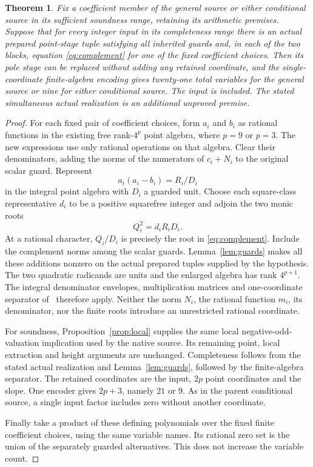 \documentclass[11pt,a4paper]{article}
\newtheorem{theorem}{Theorem}[section]
\begin{document}
\begin{theorem}\label{thm:reduction}
Fix a coefficient member of the general source or either conditional
source in its sufficient soundness range, retaining its arithmetic
premises. Suppose that for every integer input in its completeness
range there is an actual prepared point-stage tuple satisfying all
inherited guards and, in each of the two blocks, equation
\eqref{eq:complement} for one of the fixed coefficient choices.
Then its pole stage can be replaced without adding any retained
coordinate, and the single-coordinate finite-algebra encoding gives
twenty-one total variables for the general source or nine for either
conditional source. The input is included.
The stated simultaneous actual realization is an additional
unproved premise.
\end{theorem}
\begin{proof}
For each fixed pair of coefficient choices, form $a_i$ and $b_i$
as rational functions in the existing free rank-$4^p$ point algebra,
where $p=9$ or $p=3$. The new expressions use only rational
operations on that algebra. Clear their denominators, adding the
norms of the numerators of $c_i+N_i$ to the original scalar guard.
Represent
\[
                        a_i(a_i-b_i)=R_i/D_i
\]
in the integral point algebra with $D_i$ a guarded unit.
Choose each square-class representative $d_i$ to be a positive
squarefree integer and adjoin the two monic roots
\[
                            Q_i^2=d_iR_iD_i.
\]
At a rational character, $Q_i/D_i$ is precisely the root in
\eqref{eq:complement}. Include the complement norms among the
scalar guards. Lemma~\ref{lem:guards} makes all these additions
nonzero on the actual prepared tuples supplied by the hypothesis.
The two quadratic radicands are units and the enlarged algebra
has rank $4^{p+1}$. The integral denominator envelopes, multiplication
matrices and one-coordinate separator of~\cite{Unit} therefore apply.
Neither the norm $N_i$, the rational function $m_i$, its denominator,
nor the finite roots introduce an unrestricted rational coordinate.

For soundness, Proposition~\ref{prop:local} supplies the same local
negative-odd-valuation implication used by the native source.
Its remaining point, local extraction and height arguments are
unchanged. Completeness follows from the stated actual realization
and Lemma~\ref{lem:guards}, followed by the finite-algebra separator.
The retained coordinates are the input, $2p$ point coordinates and
the slope. One encoder gives $2p+3$, namely $21$ or $9$.
As in the parent conditional source, a single input factor includes
zero without another coordinate.

Finally take a product of these defining polynomials over the fixed
finite coefficient choices, using the same variable names. Its
rational zero set is the union of the separately guarded alternatives.
This does not increase the variable count.
\end{proof}
\end{document}
